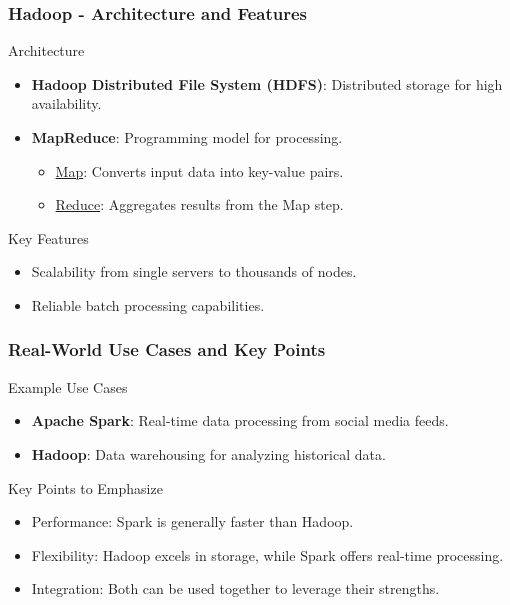 \documentclass[aspectratio=169]{beamer}
\begin{document}
\begin{frame}[fragile]
    \frametitle{Hadoop - Architecture and Features}
    \begin{block}{Architecture}
        \begin{itemize}
            \item \textbf{Hadoop Distributed File System (HDFS)}: Distributed storage for high availability.
            \item \textbf{MapReduce}: Programming model for processing.
            \begin{itemize}
                \item \underline{Map}: Converts input data into key-value pairs.
                \item \underline{Reduce}: Aggregates results from the Map step.
            \end{itemize}
        \end{itemize}
    \end{block}
    \begin{block}{Key Features}
        \begin{itemize}
            \item Scalability from single servers to thousands of nodes.
            \item Reliable batch processing capabilities.
        \end{itemize}
    \end{block}
\end{frame}

\begin{frame}[fragile]
    \frametitle{Real-World Use Cases and Key Points}
    \begin{block}{Example Use Cases}
        \begin{itemize}
            \item \textbf{Apache Spark}: Real-time data processing from social media feeds.
            \item \textbf{Hadoop}: Data warehousing for analyzing historical data.
        \end{itemize}
    \end{block}
    \begin{block}{Key Points to Emphasize}
        \begin{itemize}
            \item Performance: Spark is generally faster than Hadoop.
            \item Flexibility: Hadoop excels in storage, while Spark offers real-time processing.
            \item Integration: Both can be used together to leverage their strengths.
        \end{itemize}
    \end{block}
\end{frame}
\end{document}
